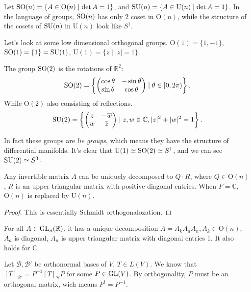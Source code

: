 
Let $\mathrm{SO}(n) = \{A\in \mathrm{O}(n) \mid \det A = 1\}$,
and $\mathrm{SU}(n) = \{A\in \mathrm{U}(n)\mid \det A = 1\}$.
In the language of groups, $\mathrm{SO}(n)$ has only 2 coset in $\mathrm{O}(n)$,
while the structure of the cosets of $\mathrm{SU}(n)$ in $\mathrm{U}(n)$ look like $S^1$.

\begin{example}
    Let's look at some low dimensional orthogonal groups.
	$\mathrm{O}(1) = \{1, -1\}$, $\mathrm{SO}(1) = \{1\} = \mathrm{SU}(1)$,
	$\mathrm{U}(1) = \{z\mid |z| = 1\}$.

	The group $\mathrm{SO}(2)$ is the rotations of $\mathbb{R}^2$:
	\[
		\mathrm{SO}(2) = \left\{
		\begin{pmatrix}\cos\theta&-\sin\theta\\\sin\theta&\cos\theta\end{pmatrix}
		\mid \theta\in [0, 2\pi)\right\}.
	\]
	While $\mathrm{O}(2)$ also consisting of reflections.
	\[
	\mathrm{SU}(2) = \left\{
	\begin{pmatrix} z &-\overline{w}\\w &\overline{z}\end{pmatrix}
	\mid z,w \in \mathbb{C}, |z|^2+|w|^2 = 1\right\}.
	\]

	In fact these groups are \textit{lie groups}, which means they have
	the structure of differential manifolds. It's clear that
	$\mathrm{U}(1) \simeq \mathrm{SO}(2) \simeq S^1$, and we can see $\mathrm{SU}(2)\simeq S^3$.
\end{example}

\begin{theorem}[QR-decomposition]
    Any invertible matrix $A$ can be uniquely decomposed to $Q\cdot R$,
	where $Q\in \mathrm{O}(n)$, $R$ is an upper triangular matrix with positive
	diagonal entries. When $F = \mathbb{C}$, $\mathrm{O}(n)$ is replaced
	by $\mathrm{U}(n)$.
\end{theorem}
\begin{proof}[Proof]
    This is essentially Schmidt orthogonalozation.
\end{proof}

\begin{corollary}
    For all $A\in \mathrm{GL}_n(\mathbb{R})$, it has a unique decomposition
	$A = A_kA_aA_n, A_k\in \mathrm{O}(n)$, $A_a$ is diagonal, $A_n$ is upper triangular
	matrix with diagonal entries 1. It also holds for $\mathbb{C}$.
\end{corollary}

Let $\mathcal{B}, \mathcal{B}'$ be orthonormal bases of $V$, $T\in L(V)$.
We know that $[T]_{\mathcal{B}'} = P^{-1}[T]_{\mathcal{B}}P$ for some $P\in \mathrm{GL}(V)$.
By orthogonality, $P$ must be an orthogonal matrix, wich means $P^t = P^{-1}$.

